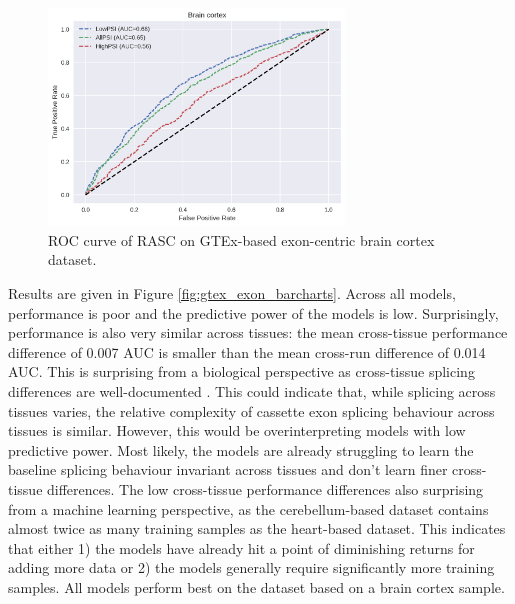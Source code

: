 \begin{figure}
	\centering\includegraphics[width=0.7\textwidth]{../visualizations/ch5-results/gtex_exon_brain_roc.png} 
	\caption{
	ROC curve of RASC on GTEx-based exon-centric brain cortex dataset. 
  }
	\label{fig:gtex_exon_roc}
\end{figure}

Results are given in Figure \ref{fig:gtex_exon_barcharts}. Across all models, performance is poor and the predictive power of the models is low. Surprisingly, performance is also very similar across tissues: the mean cross-tissue performance difference of 0.007 AUC is smaller than the mean cross-run difference of 0.014 AUC. This is surprising from a biological perspective as cross-tissue splicing differences are well-documented \cite{crosstissuesplicing}. 
This could indicate that, while splicing across tissues varies, the relative complexity of cassette exon splicing behaviour across tissues is similar. However, this would be overinterpreting models with low predictive power.
Most likely, the models are already struggling to learn the baseline splicing behaviour invariant across tissues and don't learn finer cross-tissue differences. 
The low cross-tissue performance differences also surprising from a machine learning perspective, as the cerebellum-based dataset contains almost twice as many training samples as the heart-based dataset. This indicates that either 1) the models have already hit a point of diminishing returns for adding more data or 2) the models generally require significantly more training samples. All models perform best on the dataset based on a brain cortex sample. %

